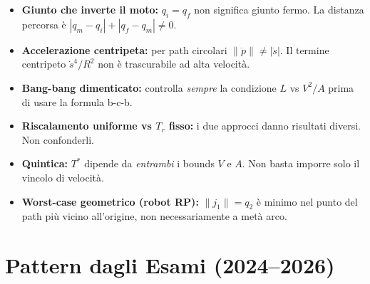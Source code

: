 \documentclass[10pt,a4paper]{article}
\newcommand{\dt}{\dot{s}}
\newcommand{\ddt}{\ddot{s}}
\begin{document}
\begin{redbox}
\begin{itemize}
  \item \textbf{Giunto che inverte il moto:} $q_i = q_f$ non significa giunto fermo.
        La distanza percorsa \`e $|q_m - q_i| + |q_f - q_m| \neq 0$.

  \item \textbf{Accelerazione centripeta:} per path circolari $\|\ddot{p}\| \neq |\ddt|$.
        Il termine centripeto $\dt^4/R^2$ non \`e trascurabile ad alta velocit\`a.

  \item \textbf{Bang-bang dimenticato:} controlla \textit{sempre} la condizione $L$ vs $V^2/A$
        prima di usare la formula b-c-b.

  \item \textbf{Riscalamento uniforme vs $T_r$ fisso:} i due approcci danno risultati diversi.
        Non confonderli.

  \item \textbf{Quintica:} $T^*$ dipende da \textit{entrambi} i bounds $V$ e $A$.
        Non basta imporre solo il vincolo di velocit\`a.

  \item \textbf{Worst-case geometrico (robot RP):} $\|j_1\| = q_2$ \`e minimo nel punto
        del path pi\`u vicino all'origine, non necessariamente a met\`a arco.
\end{itemize}
\end{redbox}

\section{Pattern dagli Esami (2024--2026)}
\end{document}
